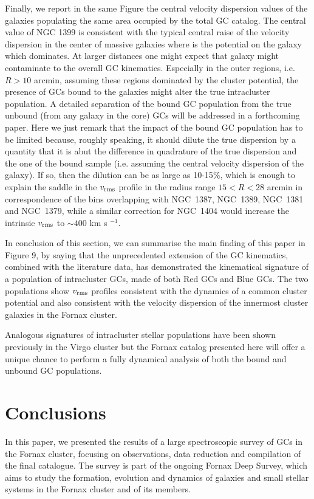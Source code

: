 \documentclass[useAMS,usenatbib]{mn2e}
\begin{document}
Finally, we report in the same Figure the central velocity dispersion values of the galaxies populating the same area occupied by the total GC catalog. The central value of NGC 1399 is consistent with the typical central raise of the velocity dispersion in the center of massive galaxies where is the potential on the galaxy which dominates. At larger distances one might expect that galaxy might contaminate to the overall GC kinematics. Especially in the outer regions, i.e. $R>10$ arcmin, assuming these regions dominated by the cluster potential, the presence of GCs bound to the galaxies might alter the true  intracluster population. A detailed separation of the bound GC population from the true unbound (from any galaxy in the core) GCs will be addressed in a forthcoming paper. Here we just remark that the impact of the bound GC population has to be limited because, roughly speaking, it should dilute the true dispersion by a quantity that it is abut the difference in quadrature of the true dispersion and the one of the bound sample (i.e. assuming the central velocity dispersion of the galaxy). If so, then the dilution can be as large as 10-15$\%$, which is enough to explain the saddle in the  $v_{\rm rms}$ profile in the radius range $15<R<28$ arcmin in correspondence of the bins overlapping with NGC~1387, NGC~1389, NGC~1381 and NGC~1379, while a similar correction for NGC~1404 would increase the intrinsic $v_{\rm rms}$ to $\sim400$ km s $^{-1}$.

In conclusion of this section, we can summarise the main finding of this paper in Figure 9, by saying that the unprecedented extension of the GC kinematics, combined with the literature data, has demonstrated the kinematical signature of a population of intracluster GCs, made of both Red GCs and Blue GCs. The two populations show $v_{\rm rms}$ profiles consistent with the dynamics of a common cluster potential and also consistent with the velocity dispersion of the innermost cluster galaxies in the Fornax cluster. 

Analogous signatures of intracluster stellar populations have been shown previously in the Virgo cluster \citep[see e.g., ][]{Arnaboldi04, Longobardi15} but the Fornax catalog presented here will offer a unique chance to perform a fully dynamical analysis of both the bound and unbound GC populations.

\section{Conclusions}
\label{sec:conclusions}
In this paper, we presented the results of a large  spectroscopic survey of GCs in the Fornax cluster, focusing on observations, data reduction and compilation of the final catalogue. The survey is part of the ongoing Fornax Deep Survey, which aims to study the formation, evolution and dynamics of galaxies and small stellar systems in the Fornax cluster and of its members.
\end{document}
